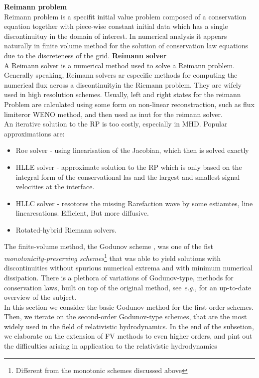 \documentclass[11pt,a4paper,headinclude=true,DIV=14,BCOR=8mm,chapterprefix,listof=totoc,twoside,openright,abstracton]{scrbook}
\begin{document}
\begin{sidenote}
    \textbf{Reimann problem} \\
    Reimann problem is a specifit initial value problem composed of a conservation equation together with piece-wise constant initial data which has a single discontinuituy in the domain of interest. In numerical analysis it appears naturally in finite volume method for the solution of conservation law equations due to the discreteness of the grid. 
    \textbf{Reimann solver} \\
    A Reimann solver is a numerical method used to solve a Reimann problem. Generally speaking, Reimann solvers ar especific methods for computing the numerical flux across a discontinuityin the Riemann problem. They are wifely used in high resolution schemes. Usually, left and right states for the reimann Problem are calculated using some form on non-linear reconstraction, such as flux limiteror WENO method, and then used as inut for the reimann solver. \\
    An iterative solution to the RP is too costly, especially in MHD. Popular approximations are:
    \begin{itemize}
        \item Roe solver - using linearisation of the Jacobian, which then is solved exactly \\
        \item HLLE solver - approximate solution to the RP which is only based on the integral form of the conservational las and the largest and smallest signal velocities at the interface.
        \item HLLC solver - resotores the missing Rarefaction wave by some estiamtes, line linearesations. Efficient, But more diffusive. 
        \item Rotated-hybrid Riemann solvers. 
    \end{itemize}
\end{sidenote}

The finite-volume method, the Godunov scheme \cite{Godunov:1959}, was one of the fist \textit{monotonicity-preserving schemes}\footnote{Different from the monotonic schemes discussed above} that was able to yield solutions with discontinuities without spurious numerical extrema and with minimum numerical dissipation. There is a plethora of variations of Godunov-type, methods for conservation laws, built on top of the original method, see \textit{e.g.,} \cite{Toro:1999} for an up-to-date overview of the subject. \\
In this section we consider the basic Godunov method for the first order schemes. Then, we iterate on the second-order Godunov-type schemes, that are the most widely used in the field of relativistic hydrodynamics. In the end of the subsetion, we elaborate on the extension of FV methods to even higher orders, and pint out the difficulties arising in application to the relativistic hydrodynamics 
\end{document}
